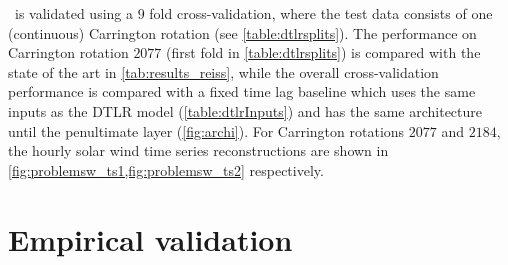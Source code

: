 \XX\ is validated using a $9$ fold cross-validation, where the test data consists of one 
(continuous) Carrington rotation (see \cref{table:dtlrsplits}). The performance on Carrington 
rotation $2077$ (first fold in \cref{table:dtlrsplits}) is compared with the state of the art 
\citep{Riley2011} in \cref{tab:results_reiss}, while the overall cross-validation performance 
is compared with a fixed time lag baseline which uses the same inputs as the DTLR model 
(\cref{table:dtlrInputs}) and has the same architecture until the penultimate layer 
(\cref{fig:archi}). For Carrington rotations $2077$ and $2184$, the hourly solar wind 
time series reconstructions are shown in \cref{fig:problemsw_ts1,fig:problemsw_ts2} respectively. 

%
\begin{table}[ht]
  \centering
  \caption{Cross validation splits used to evaluate \ \XX \ on the solar wind forecasting task}
  \label{table:dtlrsplits}
  \end{table}
%


\section{Empirical validation}\label{sec:proofconcept}

